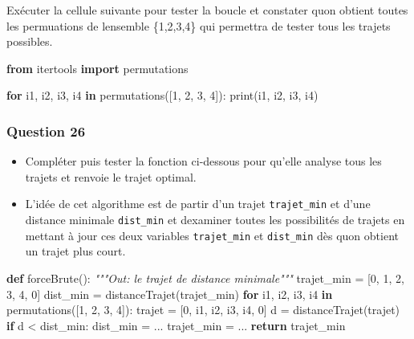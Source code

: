 \documentclass[
  paper=a4,
  ,captions=tableheading
]{scrartcl}
\newenvironment{Shaded}{}{}
\newcommand{\BuiltInTok}[1]{\textcolor[rgb]{0.00,0.50,0.00}{#1}}
\newcommand{\CommentTok}[1]{\textcolor[rgb]{0.38,0.63,0.69}{\textit{#1}}}
\newcommand{\ControlFlowTok}[1]{\textcolor[rgb]{0.00,0.44,0.13}{\textbf{#1}}}
\newcommand{\DecValTok}[1]{\textcolor[rgb]{0.25,0.63,0.44}{#1}}
\newcommand{\ImportTok}[1]{\textcolor[rgb]{0.00,0.50,0.00}{\textbf{#1}}}
\newcommand{\KeywordTok}[1]{\textcolor[rgb]{0.00,0.44,0.13}{\textbf{#1}}}
\newcommand{\NormalTok}[1]{#1}
\newcommand{\OperatorTok}[1]{\textcolor[rgb]{0.40,0.40,0.40}{#1}}
\begin{document}
Exécuter la cellule suivante pour tester la boucle et constater
qu\textquotesingle on obtient toutes les permuations de
l\textquotesingle ensemble \{1,2,3,4\} qui permettra de tester tous les
trajets possibles.

\begin{Shaded}
\begin{Highlighting}[]
\ImportTok{from}\NormalTok{ itertools }\ImportTok{import}\NormalTok{ permutations}

\ControlFlowTok{for}\NormalTok{ i1, i2, i3, i4 }\KeywordTok{in}\NormalTok{ permutations([}\DecValTok{1}\NormalTok{, }\DecValTok{2}\NormalTok{, }\DecValTok{3}\NormalTok{, }\DecValTok{4}\NormalTok{]):}
    \BuiltInTok{print}\NormalTok{(i1, i2, i3, i4)}
\end{Highlighting}
\end{Shaded}

\hypertarget{question-26}{%
\subsubsection{Question 26}\label{question-26}}

\begin{itemize}
\item
  Compléter puis tester la fonction ci-dessous pour qu'elle analyse tous
  les trajets et renvoie le trajet optimal.
\item
  L'idée de cet algorithme est de partir d'un trajet
  \texttt{trajet\_min} et d'une distance minimale \texttt{dist\_min} et
  d\textquotesingle examiner toutes les possibilités de trajets en
  mettant à jour ces deux variables \texttt{trajet\_min} et
  \texttt{dist\_min} dès qu\textquotesingle on obtient un trajet plus
  court.
\end{itemize}

\begin{Shaded}
\begin{Highlighting}[]
\KeywordTok{def}\NormalTok{ forceBrute():}
    \CommentTok{"""Out: le trajet de distance minimale"""}
\NormalTok{    trajet\_min }\OperatorTok{=}\NormalTok{ [}\DecValTok{0}\NormalTok{, }\DecValTok{1}\NormalTok{, }\DecValTok{2}\NormalTok{, }\DecValTok{3}\NormalTok{, }\DecValTok{4}\NormalTok{, }\DecValTok{0}\NormalTok{]}
\NormalTok{    dist\_min }\OperatorTok{=}\NormalTok{ distanceTrajet(trajet\_min)}
    \ControlFlowTok{for}\NormalTok{ i1, i2, i3, i4 }\KeywordTok{in}\NormalTok{ permutations([}\DecValTok{1}\NormalTok{, }\DecValTok{2}\NormalTok{, }\DecValTok{3}\NormalTok{, }\DecValTok{4}\NormalTok{]):}
\NormalTok{        trajet }\OperatorTok{=}\NormalTok{ [}\DecValTok{0}\NormalTok{, i1, i2, i3, i4, }\DecValTok{0}\NormalTok{]}
\NormalTok{        d }\OperatorTok{=}\NormalTok{ distanceTrajet(trajet)}
        \ControlFlowTok{if}\NormalTok{ d }\OperatorTok{\textless{}}\NormalTok{ dist\_min:}
\NormalTok{            dist\_min }\OperatorTok{=}\NormalTok{ ...}
\NormalTok{            trajet\_min }\OperatorTok{=}\NormalTok{ ...}
    \ControlFlowTok{return}\NormalTok{ trajet\_min}
\end{Highlighting}
\end{Shaded}
\end{document}
